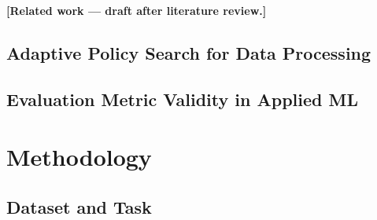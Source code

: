 \documentclass[runningheads]{llncs}
\begin{document}

\textbf{[Related work — draft after literature review.]}

\subsection{Adaptive Policy Search for Data Processing}


\subsection{Evaluation Metric Validity in Applied ML}


\section{Methodology}

\subsection{Dataset and Task}

%
%
\end{document}
